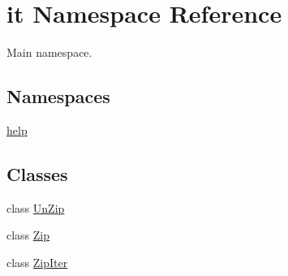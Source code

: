\hypertarget{namespaceit}{}\section{it Namespace Reference}
\label{namespaceit}


Main namespace.  


\subsection*{Namespaces}
\begin{DoxyCompactItemize}
\item 
 \hyperlink{namespaceit_1_1help}{help}
\end{DoxyCompactItemize}
\subsection*{Classes}
\begin{DoxyCompactItemize}
\item 
class \hyperlink{structit_1_1UnZip}{Un\+Zip}
\item 
class \hyperlink{classit_1_1Zip}{Zip}
\item 
class \hyperlink{classit_1_1ZipIter}{Zip\+Iter}
\end{DoxyCompactItemize}
